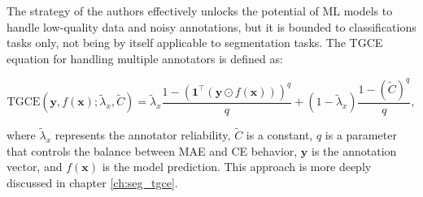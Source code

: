 The strategy of the authors effectively unlocks the potential of
\gls{ML} models to handle low-quality data and noisy annotations, but
it is bounded to classifications tasks only, not being by itself applicable to
segmentation tasks. The TGCE equation for handling multiple
annotators is defined as:

\begin{equation}
  \text{TGCE}(\mathbf{y}, f(\mathbf{x}); \tilde{\lambda}_x,
  \tilde{C}) = \tilde{\lambda}_x \frac{1-(\mathbf{1}^\top(\mathbf{y}
  \odot f(\mathbf{x})))^q}{q} + (1-\tilde{\lambda}_x)\frac{1-(\tilde{C})^q}{q},
\end{equation}

where $\tilde{\lambda}_x$ represents the annotator reliability,
$\tilde{C}$ is a constant, $q$ is a parameter that controls the
balance between MAE and CE behavior, $\mathbf{y}$ is the annotation
vector, and $f(\mathbf{x})$ is the model prediction. This approach is
more deeply discussed in chapter \ref{ch:seg_tgce}.